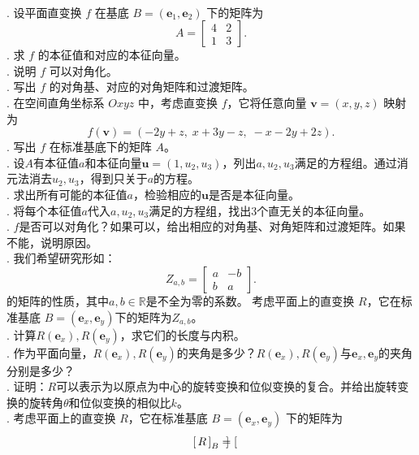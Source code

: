 \documentclass[12pt,UTF8,fontset=none]{ctexbook}
\begin{document}
\begin{xt}
    \mbox{} \\
    . 设平面直变换 $f$ 在基底 $B=(\mathbf{e}_1,\mathbf{e}_2)$ 下的矩阵为
    \[
    A = \begin{bmatrix}
    4 & 2 \\
    1 & 3
    \end{bmatrix}.
    \]
    . 求 $f$ 的本征值和对应的本征向量。\\
    . 说明 $f$ 可以对角化。\\
    . 写出 $f$ 的对角基、对应的对角矩阵和过渡矩阵。\\
    . 在空间直角坐标系 $Oxyz$ 中，考虑直变换 $f$，它将任意向量 $\mathbf{v}=(x,y,z)$ 映射为
    \[
    f(\mathbf{v}) = (-2y + z,\; x + 3y -z,\; -x - 2y + 2z).
    \]
    . 写出 $f$ 在标准基底下的矩阵 $A$。\\
    . 设$A$有本征值$a$和本征向量$\mathbf{u} = (1,u_2,u_3)$，列出$a,u_2,u_3$满足的方程组。通过消元法消去$u_2,u_3$，得到只关于$a$的方程。\\
    . 求出所有可能的本征值$a$，检验相应的$\mathbf{u}$是否是本征向量。\\
    . 将每个本征值$a$代入$a,u_2,u_3$满足的方程组，找出$3$个直无关的本征向量。\\
    . $f$是否可以对角化？如果可以，给出相应的对角基、对角矩阵和过渡矩阵。如果不能，说明原因。\\
    . 我们希望研究形如：
    \[
    Z_{a,b} = \begin{bmatrix}
    a & -b \\   
    b & a
    \end{bmatrix}.
    \]
    的矩阵的性质，其中$a,b\in\mathbb{R}$是不全为零的系数。
    考虑平面上的直变换 $R$，它在标准基底 $B=(\mathbf{e}_x,\mathbf{e}_y)$下的矩阵为$Z_{a,b}$。\\
    . 计算$R(\mathbf{e}_x),R(\mathbf{e}_y)$，求它们的长度与内积。\\
    . 作为平面向量，$R(\mathbf{e}_x),R(\mathbf{e}_y)$的夹角是多少？$R(\mathbf{e}_x),R(\mathbf{e}_y)$与$\mathbf{e}_x,\mathbf{e}_y$的夹角分别是多少？\\
    . 证明：$R$可以表示为以原点为中心的旋转变换和位似变换的复合。并给出旋转变换的旋转角$\theta$和位似变换的相似比$k$。\\
    . 考虑平面上的直变换 $R$，它在标准基底 $B=(\mathbf{e}_x,\mathbf{e}_y)$ 下的矩阵为
    \[
    \bmat{R}[B] = \begin{bmatrix}

\end{bmatrix}\]
\end{xt}
\end{document}
